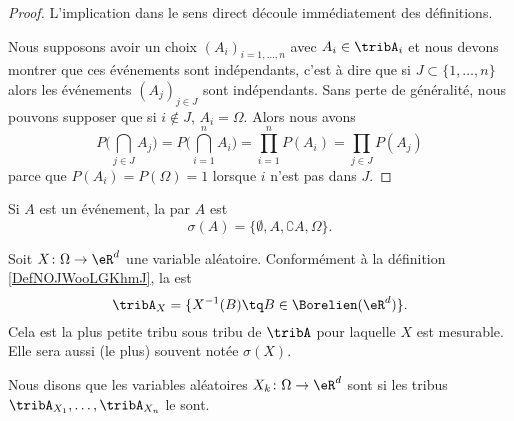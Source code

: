 \begin{proof}
    L'implication dans le sens direct découle immédiatement des définitions.

    Nous supposons avoir un choix \( (A_i)_{i=1,\ldots,n}\) avec \( A_i\in\tribA_i\) et nous devons montrer que ces événements sont indépendants, c'est à dire que si \( J\subset\{ 1,\ldots,n \}\) alors les événements \( (A_j)_{j\in J}\) sont indépendants. Sans perte de généralité, nous pouvons supposer que si \( i\notin J\), \( A_i=\Omega\). Alors nous avons
    \begin{equation}
        P\big( \bigcap_{j\in J}A_j \big)=P\big( \bigcap_{i=1}^nA_i \big)=\prod_{i=1}^nP(A_i)=\prod_{j\in J}P(A_j)
    \end{equation}
    parce que \( P(A_i)=P(\Omega)=1\) lorsque \( i\) n'est pas dans \( J\).
\end{proof}

Si \( A\) est un événement, la  par \( A\) est
\begin{equation}
    \sigma(A)=\{ \emptyset,A,\complement A,\Omega \}.
\end{equation}

Soit \( X\colon \Omega\to \eR^d\) une variable aléatoire. Conformément à la définition \ref{DefNOJWooLGKhmJ}, la  est
\begin{equation}
    \tribA_X=\{ X^{-1}(B)\tq B\in\Borelien(\eR^d) \}.
\end{equation}
Cela est la plus petite tribu sous tribu de \( \tribA\) pour laquelle \( X\) est mesurable. Elle sera aussi (le plus) souvent notée \( \sigma(X)\).

\begin{definition}  \label{DefNJUkotc}
    Nous disons que les variables aléatoires \( X_k\colon \Omega\to \eR^d\) sont  si les tribus \( \tribA_{X_1},\ldots,\tribA_{X_n}\) le sont.
\end{definition}

